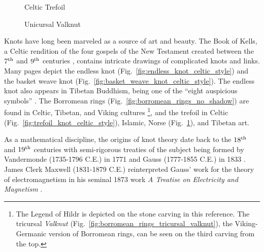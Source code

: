 \begin{figure}
    \centering
    \begin{minipage}[b]{0.49\textwidth}
        \centering
        \caption{Celtic Trefoil}
        \label{fig:trefoil_knot_celtic_style}
    \end{minipage}
    \begin{minipage}[b]{0.49\textwidth}
        \centering
        \caption{Unicursal Valknut}
        \label{fig:trefoil_unicursal_valknut}
    \end{minipage}
\end{figure}
Knots have long been marveled as a source of art and beauty. The Book of
Kells, a Celtic rendition of the four gospels of the New Testament created
between the $7^{\small\textrm{th}}$ and $9^{\small\textrm{th}}$
centuries \cite[p.~108]{Nordenfalk1977}, contains intricate drawings of
complicated knots and links. Many pages depict the endless knot
(Fig.~\ref{fig:endless_knot_celtic_style}) and the basket weave knot
(Fig.~\ref{fig:basket_weave_knot_celtic_style}). The endless knot also appears
in Tibetan Buddhism, being one of the ``eight auspicious symbols''
\cite[p.~11]{BeerTibetanSymbols}. The Borromean rings
(Fig.~\ref{fig:borromean_rings_no_shadow}) are found in Celtic, Tibetan,
and Viking cultures
\cite[p.~129]{VikingWomenJesch}%
\footnote{%
    The Legend of Hildr is depicted on the stone carving in this
    reference. The tricursal \textit{Valknut}
    (Fig.~\ref{fig:borromean_rings_tricursal_valknut}),
    the Viking-Germanic version of Borromean rings,
    can be seen on the third carving from the top.
},
and the trefoil in Celtic (Fig.~\ref{fig:trefoil_knot_celtic_style}),
Islamic, Norse (Fig.~\ref{fig:trefoil_unicursal_valknut}), and Tibetan art.
\par\hfill\par
As a mathematical discipline, the origins of knot theory
date back to the $18^{\small\textrm{th}}$ and
$19^{\small\textrm{th}}$ centuries with semi-rigorous treaties of
the subject being formed by Vandermonde (1735-1796 C.E.) in 1771
\cite{Vanermonde1771} and Gauss
(1777-1855 C.E.) in 1833 \cite[p.~1327]{RiccaNipotaGaussLinkingNumber}.
James Clerk Maxwell (1831-1879 C.E.) reinterpreted Gauss' work for the theory
of electromagnetism in his seminal 1873 work
\textit{A Treatise on Electricity and Magnetism}
\cite{MaxwellTreatist1873}.
